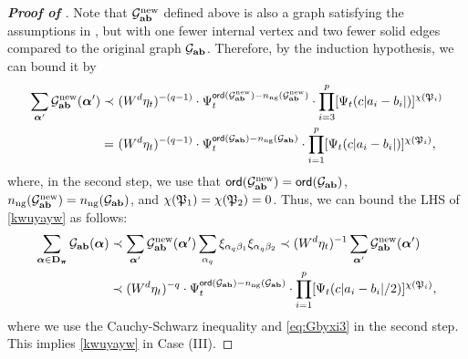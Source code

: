 \begin{proof}[\bf Proof of ]
Note that $\mathcal G^{\mathrm{new}}_{{\mathbf{a}}{\mathbf{b}}}$ defined above is also a graph satisfying the assumptions in , but with one fewer internal vertex and two fewer solid edges compared to the original graph $\mathcal G_{{\mathbf{a}}{\mathbf{b}}}$. Therefore, by the induction hypothesis, we can bound it by 
\begin{align*}
\sum_{{\boldsymbol{\alpha}}'} \mathcal G^{\mathrm{new}}_{{\mathbf{a}}{\mathbf{b}}}({\boldsymbol{\alpha}}') \prec &~ (W^d\eta_t)^{-(q-1)}  \cdot \Psi_t^{{\mathsf{ord}}(\mathcal G^{\mathrm{new}}_{{\mathbf{a}}{\mathbf{b}}})-n_{\mathrm{ng}}(\mathcal G^{\mathrm{new}}_{{\mathbf{a}}{\mathbf{b}}})} \cdot  \prod_{i=3}^p  [\Psi_t(c|a_i-b_i|)]^{\chi(\mathfrak{P}_i)} \nonumber\\
= &~ (W^d\eta_t)^{-(q-1)}\cdot \Psi_t^{{\mathsf{ord}}(\mathcal G_{{\mathbf{a}}{\mathbf{b}}})-n_{\mathrm{ng}}(\mathcal G_{{\mathbf{a}}{\mathbf{b}}})}\cdot  \prod_{i=1}^p  [\Psi_t(c|a_i-b_i|)]^{\chi(\mathfrak{P}_i)}, \end{align*}
where, in the second step, we use that ${\mathsf{ord}}(\mathcal G^{\mathrm{new}}_{{\mathbf{a}}{\mathbf{b}}})={\mathsf{ord}}(\mathcal G_{{\mathbf{a}}{\mathbf{b}}})$, $n_{\mathrm{ng}}(\mathcal G^{\mathrm{new}}_{{\mathbf{a}}{\mathbf{b}}})=n_{\mathrm{ng}}(\mathcal G_{{\mathbf{a}}{\mathbf{b}}})$, and $\chi(\mathfrak{P}_1)=\chi(\mathfrak{P}_2)=0$. 
Thus, we can bound the LHS of \eqref{kwuyayw} as follows: 
\begin{align}\label{kwuyayw_case3}
\sum_{{\boldsymbol{\alpha}}\in {\mathbf{D}}_{{\boldsymbol{\pi}}}} \mathcal G_{{\mathbf{a}}{\mathbf{b}}}({\boldsymbol{\alpha}}) &\prec \sum_{{\boldsymbol{\alpha}}'} \mathcal G^{\mathrm{new}}_{{\mathbf{a}}{\mathbf{b}}}({\boldsymbol{\alpha}}')\sum_{\alpha_q}\xi_{\alpha_q\beta_1}\xi_{\alpha_q\beta_2} \prec (W^d\eta_t)^{-1}\sum_{{\boldsymbol{\alpha}}'} \mathcal G^{\mathrm{new}}_{{\mathbf{a}}{\mathbf{b}}}({\boldsymbol{\alpha}}') \nonumber\\
&\prec (W^d\eta_t)^{-q}\cdot \Psi_t^{{\mathsf{ord}}(\mathcal G_{{\mathbf{a}}{\mathbf{b}}})-n_{\mathrm{ng}}(\mathcal G_{{\mathbf{a}}{\mathbf{b}}})}\cdot  \prod_{i=1}^p  [\Psi_t(c|a_i-b_i|/2)]^{\chi(\mathfrak{P}_i)} ,
\end{align}
where we use the Cauchy-Schwarz inequality and \eqref{eq:Gbyxi3} in the second step. This implies \eqref{kwuyayw} in Case (III). 









\end{proof}
